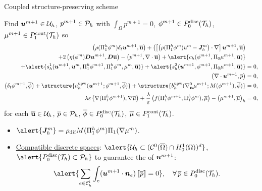 \begin{frame}{Coupled structure-preserving scheme}
  \scriptsize
  \vspace*{-0.2cm}
  \begin{block}{}
  \vspace*{-0.1cm}
  Find \alert{$\bm{u}^{m+1}\in \mathcal{U}_h$}, \alert{$p^{m+1}\in\mathcal{P}_h$} 
with $\int_\Omega p^{m+1}=0$, \alert{$\phi^{m+1}\in \relax{P}^{\text{disc}}_0(\mathcal{T}_h)$}, \alert{$\mu^{m+1}\in \relax{P}^{\text{cont}}_1(\mathcal{T}_h)$} so
\begin{subequations}
\begin{align*}
  \escalarL{\rho(\Pih_1\phi^{m})\delta_t\uu^{m+1}}{\buu}
  +\escalarL{\left[\left(\rho(\Pih_1\phi^{m})u^m-\JJ^m_h\right)\cdot\nabla\right]\uu^{m+1}}{\buu}
  &
  \nonumber\\
  +2\escalarLd{\eta(\phi^{m})\DD\uu^{m+1}}{\DD\buu}
  -\escalarL{p^{m+1}}{\nabla\cdot\buu}
  +\alert{\ch{\phi^{m+1}}{\Pi_0\mu^{m+1}}{\buu}}
  &
  \nonumber\\
  +\alert{\th{\uu^{m+1}}{\uu^{m}}{\Pih_1\phi^{m+1}}{\Pih_1\phi^m}{\mu^m}{\buu}}
  +\alert{\sh{\uu^{m+1}}{\phi^{m+1}}{\Pi_0\mu^{m+1}}{\buu}}&=0,
  \\
  \escalarL{\nabla\cdot\uu^{m+1}}{\bp}&=0,
  \\
  \escalarL{\delta_t\phi^{m+1}}{\bphi}
  +\structure{\aupw{\uu^{m+1}}{\phi^{m+1}}{\bphi}}
  +\structure{\bupw{\nabla_{\nn}^0\mu^{m+1}}{M(\phi^{m+1})}{\bphi}}&=0,\\
  \lambda\varepsilon\escalarLd{\nabla (\Pih_1 \phi^{m+1})}{\nabla\bmu}
  +\frac{\lambda}{\varepsilon}\escalarL{f(\Pih_1\phi^{m+1}, \Pih_1\phi^m)}{\bmu}-\escalarML{\mu^{m+1}}{\bmu}&=0,
\end{align*}
\end{subequations}
for each $\overline{\mathbf{u}}\in \mathcal{U}_h$, $\overline{p}\in\mathcal{P}_h$, $\overline{\phi}\in\relax{P}^{\text{disc}}_0(\mathcal{T}_h)$, $\overline{\mu}\in\relax{P}^{\text{cont}}_1(\mathcal{T}_h)$.
\end{block}

\begin{itemize}
  \item $\alert{\JJ^m_h}=\rho_\text{dif}M(\Pih_1\phi^m)\Pi_1(\nabla\mu^m)$.
  \item \underline{Compatible discrete spaces}: $\alert{\Uh\subset(\mathcal{C}^0(\overline\Omega)\cap H^1_0(\Omega))^d}$, $\alert{\Pd_0(\T_h)\subset\Ph}$ to guarantee the  of $\bm{u}^{m+1}$:
  \begin{equation*}
      \label{cha6:local_incompressibility}
      \alert{\sum_{e\in\Ehi}\int_{e} (\uu^{m+1}\cdot\nn_e) \salto{\bp}=0},\quad\forall \,\bp\in\Pd_0(\T_h).
  \end{equation*}
\end{itemize}


\end{frame}
